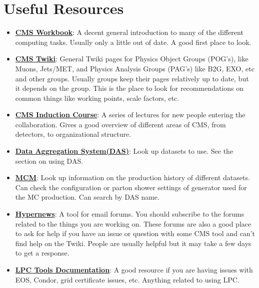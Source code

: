 \section{Useful Resources}

\begin{itemize}
  \item \textbf{\href{https://twiki.cern.ch/twiki/bin/view/CMSPublic/WorkBook}{CMS Workbook}}:
    A decent general introduction to many of the different computing tasks. Usually only a little out of date. A good first place to look. 

  \item \textbf{\href{https://twiki.cern.ch/twiki/bin/view/CMS/WebHome}{CMS Twiki}}:
    General Twiki pages for Physics Object Groups (POG's), like Muons, Jets/MET, and Physics Analysis Groups (PAG's) like B2G, EXO, etc and other groups. 
    Usually groups keep their pages relatively up to date, but it depends on the group. This is the place to look for recommendations on common things like working points, scale factors, etc. 

  \item \textbf{\href{https://indico.cern.ch/event/639530/timetable/}{CMS Induction Course}}:
    A series of lectures for new people entering the collaboration. Gives a good overview of different areas of CMS, from detectors, to organizational structure.

  \item \textbf{\href{https://cmsweb.cern.ch/das/}{Data Aggregation System(DAS)}}:
    Look up datasets to use. See the section on using DAS.

  \item \textbf{\href{https://cms-pdmv.cern.ch/mcm/requests?page=0&shown=127}{MCM}}:
    Look up information on the production history of different datasets. Can check the configuration or parton shower settings of generator used for the MC production.
    Can search by DAS name. 

  \item \textbf{\href{https://hypernews.cern.ch/HyperNews/CMS/cindex}{Hypernews}}:
    A tool for email forums. You should subscribe to the forums related to the things you are working on. These forums are also a good place to ask for help if you have an issue or question 
    with some CMS tool and can't find help on the Twiki. People are usually helpful but it may take a few days to get a response. 

  \item \textbf{\href{https://uscms.org/uscms_at_work/physics/computing/setup/index.shtml}{LPC Tools Documentation}}:
    A good resource if you are having issues with EOS, Condor, grid certificate issues, etc. Anything related to using LPC. 


\end{itemize}
